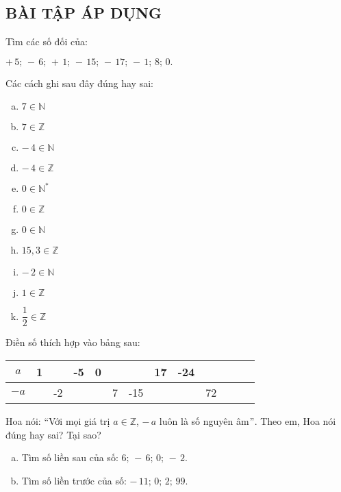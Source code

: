 \subsection{BÀI TẬP ÁP DỤNG}
\begin{bt}
Tìm các số đối của:
\begin{center}
$+ \,5; \,- \, 6; \, + \, 1; \, - \, 15; \, - \, 17; \, - \, 1; \, 8; \, 0.$
\end{center}
\end{bt}   \begin{bt} 
Các cách ghi sau đây đúng hay sai:
\begin{multicols}{3}
\begin{enumerate}[a)]
\item $7 \in \mathbb{N}$  
\item $7 \in \mathbb{Z}$
\item $- \, 4 \in \mathbb{N}$
\item $- \, 4 \in \mathbb{Z}$
\item $0 \in \mathbb{N^*}$
\item $0 \in \mathbb{Z}$
\item $0 \in \mathbb{N}$
\item $15,3 \in \mathbb{Z}$
\item $- \, 2 \in \mathbb{N}$
\item $1 \in \mathbb{Z}$
\item $\dfrac{1}{2} \in \mathbb{Z}$
\end{enumerate}
\end{multicols}
\end{bt}   \begin{bt}
Điền số thích hợp vào bảng sau:
\begin{center}
\begin{tabular}{|c|c|c|c|c|c|c|c|c|c|c|c|c|}
\hline
{$a$} & {1} &  & {-5} & {0} & & & {17} & {-24}&\\
\hline
{$-a$} &  & {-2} & & & {7} & {-15} & & & {72}\\
\hline
\end{tabular}
\end{center}
\end{bt}   \begin{bt}
Hoa nói: ``Với mọi giá trị $a \in \mathbb{Z}$, $-\, a$ luôn là số nguyên âm$"$. Theo em, Hoa nói đúng hay sai? Tại sao?
\end{bt}   \begin{bt} \qquad
\begin{enumerate}[a)]
\item Tìm số liền sau của số: $6; \,- \,6; \,0; \,- \,2.$
\item Tìm số liền trước của số: $- \,11; \,0; \,2; \,99.$
\end{enumerate}

\end{bt}
